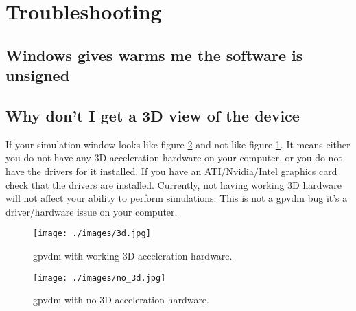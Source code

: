 \newpage
\section{Troubleshooting}
\subsection{Windows gives warms me the software is unsigned}

\subsection{Why don't I get a 3D view of the device}

If your simulation window looks like figure \ref{fig:nothreed} and not like figure \ref{fig:threed}.  It means  either you do not have any 3D acceleration hardware on your computer, or you do not have the drivers for it installed.  If you have an ATI/Nvidia/Intel graphics card check that the drivers are installed.  Currently, not having working 3D hardware will not affect your ability to perform simulations. This is not a gpvdm bug it's a driver/hardware issue on your computer.

\begin{figure}[H]
\centering
\texttt{[image: ./images/3d.jpg]}
\caption{gpvdm with working 3D acceleration hardware.}
\label{fig:threed}
\end{figure}

\begin{figure}[H]
\centering
\texttt{[image: ./images/no\_3d.jpg]}
\caption{gpvdm with no 3D acceleration hardware.}
\label{fig:nothreed}
\end{figure}


